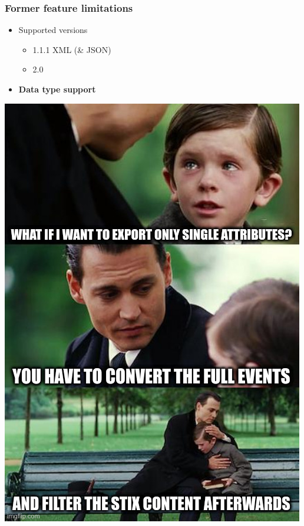 \begin{frame}
    \frametitle{Former feature limitations}
    \begin{minipage}{0.5\textwidth}
        \begin{itemize}
            \item Supported versions
            \begin{itemize}
                \item 1.1.1 XML (\& JSON)
                \item 2.0
            \end{itemize}
            \item {\bf Data type support}
        \end{itemize}
    \end{minipage}%
    \begin{minipage}{0.5\textwidth}
        \centering
        \includegraphics[width=\textwidth]{images/limited_data_type.jpg}
    \end{minipage}
\end{frame}

